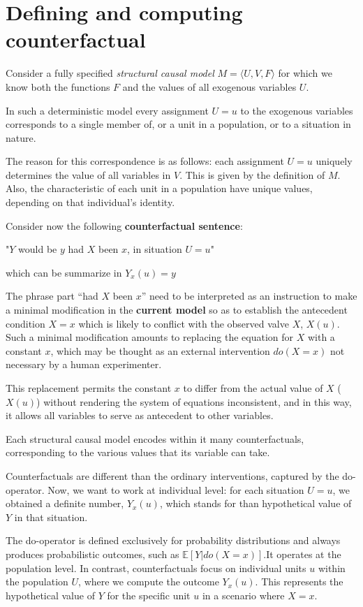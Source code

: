 \section{Defining and computing counterfactual}
Consider a fully specified \textit{structural causal model} $M=\langle U, V,F \rangle$
for which we know both the functions $F$ and the values of all exogenous variables $U$.

In such a deterministic model every assignment $U = u$ to the exogenous variables
corresponds to a single member of, or a unit in a population, or to a situation
in nature.

The reason for this correspondence is as follows: each assignment $U = u$ uniquely
determines the value of all variables in $V$. This is given by the definition of $M$.
Also, the characteristic of each unit in a population have unique values, depending
on that individual's identity.

Consider now the following \textbf{counterfactual sentence}:
\begin{center}
    "$Y$ would be $y$ had $X$ been $x$, in situation $U=u$"
\end{center}
which can be summarize in $Y_x(u) = y$

The phrase part ``had $X$ been $x$'' need to be interpreted as an instruction to
make a minimal modification in the \textbf{current model} so as to establish the
antecedent condition $X = x$ which is likely to conflict with the observed valve
$X$, $X(u)$. Such a minimal modification amounts to replacing the equation for
$X$ with a constant $x$, which may be thought as an external intervention $do(X = x)$
not necessary by a human experimenter.

This replacement permits the constant $x$ to differ from the actual value of $X$
($X(u)$) without rendering the system of equations inconsistent, and in this way,
it allows all variables to serve as antecedent to other variables.

Each structural causal model encodes within it many counterfactuals, corresponding
to the various values that its variable can take.

Counterfactuals are different than the ordinary interventions, captured by the
do-operator. Now, we want to work at individual level: for each situation $U = u$,
we obtained a definite number, $Y_x (u)$, which stands for than hypothetical value
of $Y$ in that situation.

The do-operator is defined exclusively for probability distributions and always
produces probabilistic outcomes, such as $\mathbb{E}[Y|do(X = x)]$.It operates at
the population level. In contrast, counterfactuals focus on individual units
$u$ within the population $U$, where we compute the outcome $Y_x(u)$. This represents
the hypothetical value of $Y$ for the specific unit $u$ in a scenario where $X = x$.

